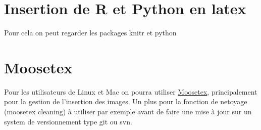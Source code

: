 \section{Insertion de R et Python en latex}

Pour cela on peut regarder les packages knitr
et python


\section{Moosetex}

Pour les utilisateurs de Linux et Mac on pourra utiliser 
\href{http://www.math.u-bordeaux1.fr/~cdeledal/moosetex}{Moosetex},
principalement pour la gestion de l'insertion des images.
Un plus pour la fonction de netoyage (moosetex cleaning) \`a utiliser par exemple
avant de faire une mise \`a jour sur un system de versionnement type git ou svn.
